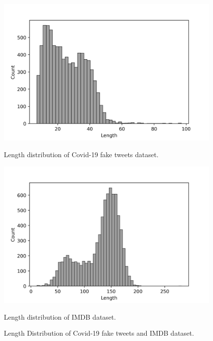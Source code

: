 \documentclass[%
	BCOR=8mm, %
	DIV=12,
	toc=bibliography, %
	toc=listof, %
	oneside, %
	egregdoesnotlikesansseriftitles, %
	]{scrbook}
\begin{document}
\begin{figure}[H]
     \hspace*{-.7em}
    \begin{minipage}[b]{0.5\linewidth}
        \centering
        \includegraphics[width=\textwidth]{img/fakenewsLengthdist.png}
        \caption{Length distribution of Covid-19 fake tweets dataset.}
        \label{fig:fklendist}
    \end{minipage}
    \hspace{0.1cm}
    \begin{minipage}[b]{0.5\linewidth}
        \centering
        \includegraphics[width=\textwidth]{img/ImdbLengthdist.png}
        \caption{Length distribution of IMDB dataset.}{}
        \label{fig:imdblendist}
    \end{minipage}
    \caption[Length distribution of Covid-19 fake tweets and IMDB dataset]{\small Length Distribution of Covid-19 fake tweets and IMDB dataset.}
    \label{fig:lendist}
\end{figure}
\end{document}
